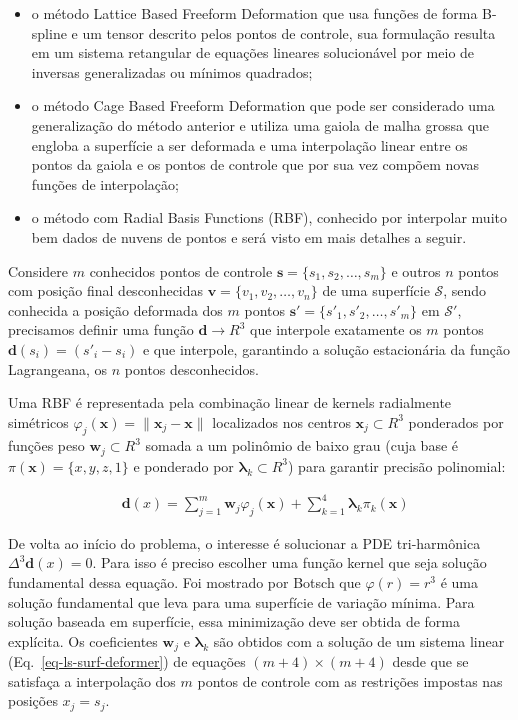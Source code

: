 \renewcommand{\labelitemi}{•}
\begin{itemize}
  \item o método Lattice Based Freeform Deformation que usa funções de forma B-spline e um tensor descrito pelos pontos de controle, sua formulação resulta em um sistema retangular de equações lineares solucionável por meio de inversas generalizadas ou mínimos quadrados;
  \item o método Cage Based Freeform Deformation que pode ser considerado uma generalização do método anterior e utiliza uma gaiola de malha grossa que engloba a superfície a ser deformada e uma interpolação linear entre os pontos da gaiola e os pontos de controle que por sua vez compõem novas funções de interpolação;
  \item o método com Radial Basis Functions (RBF), conhecido por interpolar muito bem dados de nuvens de pontos e será visto em mais detalhes a seguir.
\end{itemize}

Considere $m$ conhecidos pontos de controle $\boldsymbol{s}=\{s_1, s_2, \ldots, s_m\}$ e outros $n$ pontos com posição final desconhecidas $\boldsymbol{v}=\{v_1, v_2, \ldots, v_n\}$ de uma superfície $\mathcal{S}$, sendo conhecida a posição deformada dos $m$ pontos $\boldsymbol{s'}=\{s'_1, s'_2, \ldots, s'_m\}$ em $\mathcal{S}'$, precisamos definir uma função $\boldsymbol{d}\to R^3$ que interpole exatamente os $m$ pontos $\boldsymbol{d}(s_i)=(s'_i-s_i)$ e que interpole, garantindo a solução estacionária da função Lagrangeana, os $n$ pontos desconhecidos.

Uma RBF é representada pela combinação linear de kernels radialmente simétricos $\varphi_j(\boldsymbol{x})=\lVert\boldsymbol{x}_j-\boldsymbol{x}\rVert$ localizados nos centros $\boldsymbol{x}_j\subset R^3$ ponderados por funções peso $\boldsymbol{w}_j\subset R^3$ somada a um polinômio de baixo grau (cuja base é $\pi(\boldsymbol{x})=\{x,y,z,1\}$ e ponderado por $\boldsymbol{\lambda}_k\subset R^3$) para garantir precisão polinomial:

\begin{align}
  &\boldsymbol{d}(x)=\sum_{j=1}^m \boldsymbol{w}_j\varphi_j(\boldsymbol{x})+\sum_{k=1}^4 \boldsymbol{\lambda}_k\pi_k(\boldsymbol{x})\label{eq-surf-rbf}
\end{align}

De volta ao início do problema, o interesse é solucionar a PDE tri-harmônica $\Delta^3\boldsymbol{d}(x)=0$. Para isso é preciso escolher uma função kernel que seja solução fundamental dessa equação. Foi mostrado por Botsch\cite{Botsch} que $\varphi(r)=r^3$ é uma solução fundamental que leva para uma superfície de variação mínima. Para solução baseada em superfície, essa minimização deve ser obtida de forma explícita. Os coeficientes $\boldsymbol{w}_j$ e $\boldsymbol{\lambda}_k$ são obtidos com a solução de um sistema linear (Eq.~\ref{eq-ls-surf-deformer}) de equações $(m+4)\times(m+4)$ desde que se satisfaça a interpolação dos $m$ pontos de controle com as restrições impostas nas posições $x_j=s_j$.\cite{Muller}

